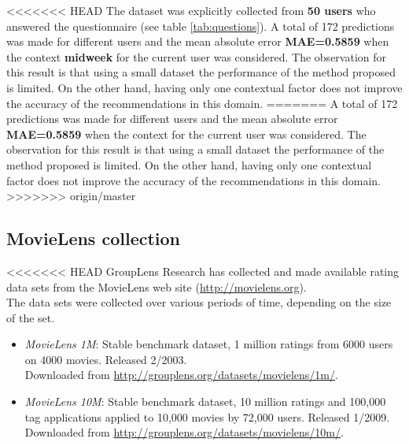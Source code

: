 <<<<<<< HEAD
The dataset was explicitly collected from \textbf{50 users} who
answered the questionnaire (see table \ref{tab:questions}). A total of 172
predictions was made for different users and the mean absolute error
\textbf{MAE=0.5859} when the context \textbf{midweek} for the current user
was considered. The observation for this result is that using a small
dataset the performance of the method proposed is limited. On the other
hand, having only one contextual factor does not improve the accuracy
of the recommendations in this domain.
=======
A total of 172 predictions was made for different users and the 
mean absolute error \textbf{MAE=0.5859} when the context 
for the current user was considered. 
The observation for this result is that using a small
dataset the performance of the method proposed is limited. On the other
hand, having only one contextual factor does not improve the accuracy
of the recommendations in this domain.
>>>>>>> origin/master
\subsection{MovieLens collection} 
<<<<<<< HEAD
GroupLens Research has collected and made available rating data sets
from the MovieLens web site (\url{http://movielens.org}). \\The data sets
were collected over various periods of time,  depending on the size of
the set.
\begin{itemize} 
\item \textit{MovieLens 1M}: Stable benchmark dataset, 
1 million ratings from 6000 users on 4000 movies.
Released 2/2003.\\ Downloaded from
\url{http://grouplens.org/datasets/movielens/1m/}. 
\item \textit{MovieLens 10M}: Stable benchmark dataset, 
10 million ratings and 100,000
tag applications applied to 10,000 movies by 72,000 users. 
Released 1/2009. \\Downloaded from
\url{http://grouplens.org/datasets/movielens/10m/}. 
\end{itemize}

